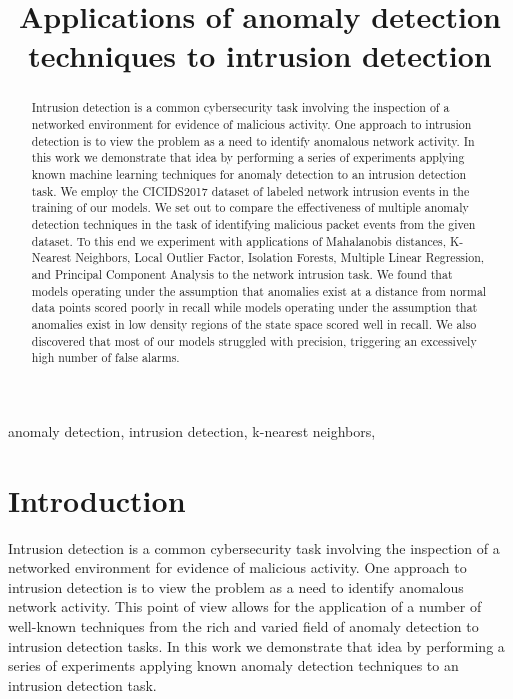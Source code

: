 \documentclass[conference]{IEEEtran}
\begin{document}
\title{Applications of anomaly detection techniques to intrusion detection}

\author{
}

\maketitle

\begin{abstract}
Intrusion detection is a common cybersecurity task involving the inspection of a networked environment for evidence of malicious activity. One approach to intrusion detection is to view the problem as a need to identify anomalous network activity. In this work we demonstrate that idea by performing a series of experiments applying known machine learning techniques for anomaly detection to an intrusion detection task. We employ the CICIDS2017 dataset of labeled network intrusion events in the training of our models. We set out to compare the effectiveness of multiple anomaly detection techniques in the task of identifying malicious packet events from the given dataset. To this end we experiment with applications of Mahalanobis distances, K-Nearest Neighbors, Local Outlier Factor, Isolation Forests, Multiple Linear Regression, and Principal Component Analysis to the network intrusion task. We found that models operating under the assumption that anomalies exist at a distance from normal data points scored poorly in recall while models operating under the assumption that anomalies exist in low density regions of the state space scored well in recall. We also discovered that most of our models struggled with precision, triggering an excessively high number of false alarms.
\end{abstract}

\begin{IEEEkeywords}
anomaly detection, intrusion detection, k-nearest neighbors, 
\end{IEEEkeywords}

\section{Introduction}

Intrusion detection is a common cybersecurity task involving the inspection of a networked environment for evidence of malicious activity. One approach to intrusion detection is to view the problem as a need to identify anomalous network activity. This point of view allows for the application of a number of well-known techniques from the rich and varied field of anomaly detection to intrusion detection tasks. In this work we demonstrate that idea by performing a series of experiments applying known anomaly detection techniques to an intrusion detection task.
\end{document}
